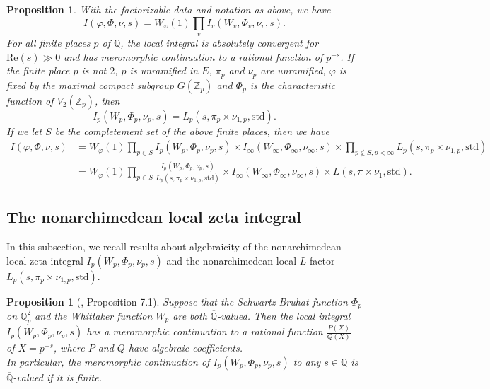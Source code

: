 \documentclass[11pt, a4paper]{amsart}
\theoremstyle{plain}
\newtheorem{proposition}[theorem]{Proposition}
\theoremstyle{definition}
\numberwithin{equation}{section}
\def\QQ{\mathbb{Q}}
\def\ZZ{\mathbb{Z}}
\newcommand{\Qp}{\QQ_p}
\begin{document}
\begin{proposition} \textnormal{\cite{Gelbart&PS84, Baruch97} \cite[Proposition 3.11.]{PS18}}
\label{Prop:factorize}
With the factorizable data and notation as above,  we have 
\begin{equation*}
    I(\varphi, \Phi, \nu, s) = W_{\varphi}(1) \prod_{v} I_{v}(W_{v}, \Phi_{v}, \nu_v, s). 
\end{equation*}
For all finite places $p$ of $\QQ$, the local integral is absolutely convergent for $\mathrm{Re}(s) \gg 0$ and has meromorphic continuation to a rational function of $p^{-s}$.
If the finite place $p$ is not $2$, $p$ is unramified in $E$, $\pi_{p}$ and $\nu_{p}$ are unramified, $\varphi$ is fixed by the maximal compact subgroup $G(\ZZ_{p})$ and $\Phi_{p}$ is the characteristic function of $V_2(\ZZ_{p})$, then 
\begin{equation*}
    I_{p}(W_{p}, \Phi_{p}, \nu_{p}, s) = L_{p}(s, \pi_{p} \times \nu_{1, p}, \mathrm{std}).
\end{equation*}
If we let $S$ be the completement set of the above finite places, then we have 
\begin{align*}
    I(\varphi, \Phi, \nu, s) &= W_{\varphi}(1) \prod_{p \in S}  I_{p}(W_{p}, \Phi_{p}, \nu_{p}, s) \times I_{\infty}(W_{\infty}, \Phi_{\infty}, \nu_{\infty}, s) \times \prod_{p \notin S, p < \infty} L_{p}(s, \pi_{p} \times \nu_{1, p}, \mathrm{std}) \\
                             &= W_{\varphi}(1) \prod_{p \in S} \frac{I_{p}(W_{p}, \Phi_{p}, \nu_{p}, s)}{L_{p}(s, \pi_{p} \times \nu_{1, p}, \mathrm{std})} 
                             \times I_{\infty}(W_{\infty}, \Phi_{\infty}, \nu_{\infty}, s) \times L(s, \pi \times \nu_{1}, \mathrm{std}).
\end{align*}

\end{proposition}

\subsection{The nonarchimedean local zeta integral}
\label{SS: the nonarch integral}
In this subsection, we recall results about algebraicity of the nonarchimedean local zeta-integral $I_{p}(W_{p}, \Phi_{p}, \nu_{p}, s)$ and the nonarchimedean local $L$-factor $L_{p}(s, \pi_{p} \times \nu_{1, p}, \mathrm{std})$.

\begin{proposition}[\cite{PS18}, Proposition 7.1]
\label{prop: PS18 proposition 7.1}
    Suppose that the Schwartz-Bruhat function $\Phi_p$ on $\Qp^{2}$ and the Whittaker function $W_p$ are both $\overline{\QQ}$-valued. Then the local integral $I_{p}(W_{p}, \Phi_{p}, \nu_{p}, s)$ has a meromorphic continuation to a rational function $\frac{P(X)}{Q(X)}$ of $X = p^{-s}$, where $P$ and $Q$ have algebraic coefficients. \\ 
    In particular, the meromorphic continuation of $I_{p}(W_{p}, \Phi_{p}, \nu_{p}, s)$ to any $s \in \QQ$ is $\overline{\QQ}$-valued if it is finite. 
\end{proposition}
\end{document}
